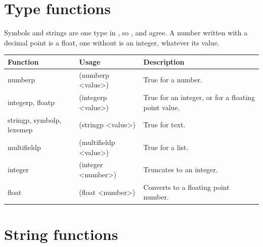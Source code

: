 \section{Type functions}

Symbols and strings are one type in \Morendo, so ,
 and  agree. A number written with a decimal
point is a float, one without is an integer, whatever its value.

\begin{longtable}{>{\ttfamily\raggedright\arraybackslash}p{1.45in} >{\ttfamily\small\raggedright\arraybackslash}p{2.05in} >{\raggedright\arraybackslash}p{2.5in}}
\toprule
\normalfont Function & \normalfont Usage & Description \\
\midrule
\endhead
numberp & (numberp <value>) & True for a number. \\
integerp, floatp & (integerp <value>) & True for an integer, or for a floating point value. \\
stringp, symbolp, lexemep & (stringp <value>) & True for text. \\
multifieldp & (multifieldp <value>) & True for a list. \\
integer & (integer <number>) & Truncates to an integer. \\
float & (float <number>) & Converts to a floating point number. \\
\bottomrule
\end{longtable}

\section{String functions}

